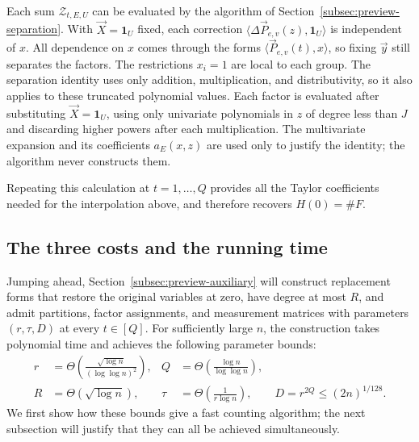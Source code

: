 Each sum $\mathcal Z_{t,E,U}$ can be evaluated by the algorithm
of Section~\ref{subsec:preview-separation}. With
$\vec X=\mathbf1_U$ fixed, each correction
$\langle\Delta\vec P_{e,v}(z),\mathbf1_U\rangle$ is independent of $x$.
All dependence on $x$ comes through the forms
$\langle\vec P_{e,v}(t),x\rangle$, so fixing $\vec y$ still separates
the factors. The restrictions $x_i=1$ are local to each
group. The separation identity uses only addition, multiplication,
and distributivity, so it also applies to these truncated polynomial
values. Each factor is evaluated after substituting
$\vec X=\mathbf1_U$, using only univariate polynomials in $z$
of degree less than $J$ and discarding higher powers after each
multiplication. The multivariate expansion and its coefficients
$a_E(x,z)$ are used only to justify the identity; the algorithm
never constructs them.

Repeating this calculation at $t=1,\ldots,Q$ provides all the
Taylor coefficients needed for the interpolation above, and
therefore recovers $H(0)=\#F$.

\subsection{The three costs and the running time}
\label{subsec:preview-parameters}
Jumping ahead, Section~\ref{subsec:preview-auxiliary} will construct
replacement forms that restore the original variables at zero,
have degree at most $R$, and admit partitions, factor assignments, and measurement matrices with parameters $(r,\tau,D)$ at every
$t\in[Q]$. For sufficiently large $n$, the construction takes
polynomial time and achieves the following parameter bounds:
\begin{equation}\label{eq:overview-parameter-bounds}
 \begin{aligned}
 r&=\Theta\!\left(\frac{\sqrt{\log n}}{(\log\log n)^2}\right),
 &Q&=\Theta\!\left(\frac{\log n}{\log\log n}\right),\\
 R&=\Theta(\sqrt{\log n}),
 &\tau&=\Theta\!\left(\frac1{r\log n}\right),\qquad
 D=r^{2Q}\le(2n)^{1/128}.
 \end{aligned}
\end{equation}
We first show how these bounds give a fast counting algorithm;
the next subsection will justify that they can all be achieved
simultaneously.

